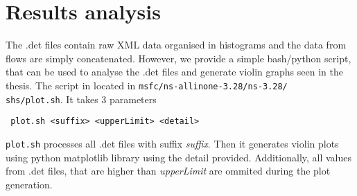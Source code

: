 \section{Results analysis}

The .det files contain raw XML data organised in histograms and the data from flows are simply concatenated. However, we provide a simple bash/python script, that can be used to analyse the .det files and generate violin graphs seen in the thesis. The script in located in \texttt{\small msfc/ns-allinone-3.28/ns-3.28/ \\ shs/plot.sh}. It takes 3 parameters

\vspace{3mm}
\texttt{\small
plot.sh <suffix> <upperLimit> <detail>
}
\vspace{3mm}

\texttt{plot.sh} processes all .det files with suffix \emph{suffix}. Then it generates violin plots using python matplotlib library using the detail provided. Additionally, all values from .det files, that are higher than \emph{upperLimit} are ommited during the plot generation.










































